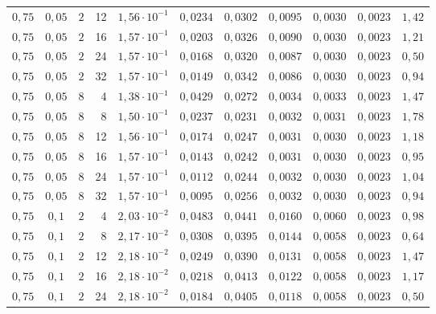 \begin{tabular}{cccrccccccc}
$0{,}75$ & $0{,}05$ & $2$ & 12 & $1{,}56 \cdot 10^{-1}$ & $0{,}0234$ & $0{,}0302$ & $0{,}0095$ & $0{,}0030$ & $0{,}0023$ & $1{,}42$ \\
$0{,}75$ & $0{,}05$ & $2$ & 16 & $1{,}57 \cdot 10^{-1}$ & $0{,}0203$ & $0{,}0326$ & $0{,}0090$ & $0{,}0030$ & $0{,}0023$ & $1{,}21$ \\
$0{,}75$ & $0{,}05$ & $2$ & 24 & $1{,}57 \cdot 10^{-1}$ & $0{,}0168$ & $0{,}0320$ & $0{,}0087$ & $0{,}0030$ & $0{,}0023$ & $0{,}50$ \\
$0{,}75$ & $0{,}05$ & $2$ & 32 & $1{,}57 \cdot 10^{-1}$ & $0{,}0149$ & $0{,}0342$ & $0{,}0086$ & $0{,}0030$ & $0{,}0023$ & $0{,}94$ \\
\midrule
$0{,}75$ & $0{,}05$ & $8$ & 4 & $1{,}38 \cdot 10^{-1}$ & $0{,}0429$ & $0{,}0272$ & $0{,}0034$ & $0{,}0033$ & $0{,}0023$ & $1{,}47$ \\
$0{,}75$ & $0{,}05$ & $8$ & 8 & $1{,}50 \cdot 10^{-1}$ & $0{,}0237$ & $0{,}0231$ & $0{,}0032$ & $0{,}0031$ & $0{,}0023$ & $1{,}78$ \\
$0{,}75$ & $0{,}05$ & $8$ & 12 & $1{,}56 \cdot 10^{-1}$ & $0{,}0174$ & $0{,}0247$ & $0{,}0031$ & $0{,}0030$ & $0{,}0023$ & $1{,}18$ \\
$0{,}75$ & $0{,}05$ & $8$ & 16 & $1{,}57 \cdot 10^{-1}$ & $0{,}0143$ & $0{,}0242$ & $0{,}0031$ & $0{,}0030$ & $0{,}0023$ & $0{,}95$ \\
$0{,}75$ & $0{,}05$ & $8$ & 24 & $1{,}57 \cdot 10^{-1}$ & $0{,}0112$ & $0{,}0244$ & $0{,}0032$ & $0{,}0030$ & $0{,}0023$ & $1{,}04$ \\
$0{,}75$ & $0{,}05$ & $8$ & 32 & $1{,}57 \cdot 10^{-1}$ & $0{,}0095$ & $0{,}0256$ & $0{,}0032$ & $0{,}0030$ & $0{,}0023$ & $0{,}94$ \\
\midrule
$0{,}75$ & $0{,}1$ & $2$ & 4 & $2{,}03 \cdot 10^{-2}$ & $0{,}0483$ & $0{,}0441$ & $0{,}0160$ & $0{,}0060$ & $0{,}0023$ & $0{,}98$ \\
$0{,}75$ & $0{,}1$ & $2$ & 8 & $2{,}17 \cdot 10^{-2}$ & $0{,}0308$ & $0{,}0395$ & $0{,}0144$ & $0{,}0058$ & $0{,}0023$ & $0{,}64$ \\
$0{,}75$ & $0{,}1$ & $2$ & 12 & $2{,}18 \cdot 10^{-2}$ & $0{,}0249$ & $0{,}0390$ & $0{,}0131$ & $0{,}0058$ & $0{,}0023$ & $1{,}47$ \\
$0{,}75$ & $0{,}1$ & $2$ & 16 & $2{,}18 \cdot 10^{-2}$ & $0{,}0218$ & $0{,}0413$ & $0{,}0122$ & $0{,}0058$ & $0{,}0023$ & $1{,}17$ \\
$0{,}75$ & $0{,}1$ & $2$ & 24 & $2{,}18 \cdot 10^{-2}$ & $0{,}0184$ & $0{,}0405$ & $0{,}0118$ & $0{,}0058$ & $0{,}0023$ & $0{,}50$ \\

\end{tabular}
